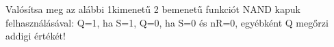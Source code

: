 \begin{example}

Valósítsa meg az alábbi 1kimenetű 2 bemenetű funkciót NAND kapuk felhasználásával: Q=1, ha S=1, Q=0, ha S=0 és nR=0, egyébként Q megőrzi addigi értékét!

\tcbline
\vspace{1mm}

\solution

\end{example}